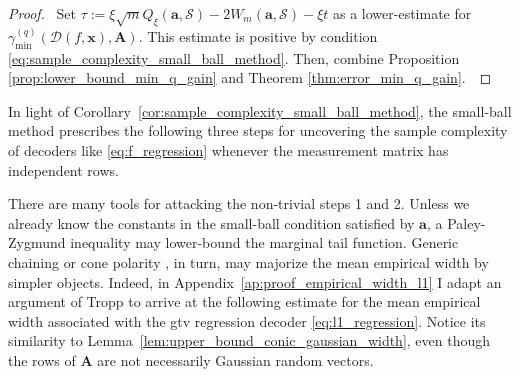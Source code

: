 \begin{proof}
    \pf\ Set $\tau := \xi \sqrt{m} Q_{\xi}(\mathbf{a}, \mathcal{S}) - 2 W_{m}(\mathbf{a}, \mathcal{S}) - \xi t$ as a lower-estimate for $\gamma_{\min}^{(q)} \left ( \mathcal{D}( f, \mathbf{x}), \mathbf{A} \right )$. This estimate is positive by condition \eqref{eq:sample_complexity_small_ball_method}. Then, combine Proposition \ref{prop:lower_bound_min_q_gain} and Theorem \ref{thm:error_min_q_gain}.~\qedsymbol
\end{proof}

In light of Corollary~\ref{cor:sample_complexity_small_ball_method}, the small-ball method prescribes the following three steps for uncovering the sample complexity of decoders like \eqref{eq:f_regression} whenever the measurement matrix has independent rows.
\begin{algorithm}
	\begin{algorithmic}[1]
	\end{algorithmic}
\end{algorithm}

There are many tools for attacking the non-trivial steps 1 and 2. Unless we already know the constants in the small-ball condition satisfied by $\mathbf{a}$, a Paley-Zygmund inequality \cite[Prop. 3.3.1]{delapena1999} may lower-bound the marginal tail function. Generic chaining \cite[Ch. 2]{talagrand2014} or cone polarity \cite[Prop 7.1]{tropp2015a}, in turn, may majorize the mean empirical width by simpler objects. Indeed, in Appendix~\ref{ap:proof_empirical_width_l1} I adapt an argument of Tropp to arrive at the following estimate for the mean empirical width associated with the \acrshort{gtv} regression decoder \eqref{eq:l1_regression}. Notice its similarity to Lemma~\ref{lem:upper_bound_conic_gaussian_width}, even though the rows of $\mathbf{A}$ are not necessarily Gaussian random vectors.

